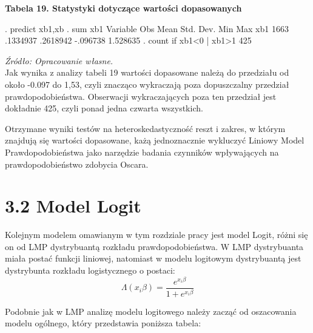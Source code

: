  \vspace{0.5cm}

\textbf{Tabela 19. Statystyki dotyczące wartości dopasowanych}
\begin{stlog}	

. predict xb1,xb
{\smallskip}
. sum xb1
{\smallskip}
    Variable {\VBAR}       Obs        Mean    Std. Dev.       Min        Max
         xb1 {\VBAR}      1663    .1334937    .2618942   -.096738   1.528635
{\smallskip}
. count if xb1<0 | xb1>1
  425

\end{stlog}

\textit{\footnotesize{Źródło: Opracowanie własne.}} \\	

Jak wynika z analizy tabeli 19 wartości dopasowane należą do przedziału od około -0.097 do 1,53, czyli znacząco wykraczają poza dopuszczalny przedział prawdopodobieństwa. Obserwacji wykraczających poza ten przedział jest dokładnie 425, czyli ponad jedna czwarta wszystkich.

Otrzymane wyniki testów na heteroskedastyczność reszt i zakres, w którym znajdują się wartości dopasowane, każą jednoznacznie wykluczyć Liniowy Model Prawdopodobieństwa jako narzędzie badania czynników wpływających na prawdopodobieństwo zdobycia Oscara.

\section*{3.2 Model Logit}

Kolejnym modelem omawianym w tym rozdziale pracy jest model Logit, różni się on od LMP dystrybuantą rozkładu prawdopodobieństwa. W LMP dystrybuanta miała postać funkcji liniowej, natomiast w modelu logitowym dystrybuantą jest dystrybunta rozkładu logistycznego o postaci: 
\begin{equation}
	\Lambda(x_i\beta)=\frac{e^{x_i\beta}}{1+e^{x_i\beta}}
\end{equation}
	
Podobnie jak w LMP analizę modelu logitowego należy zacząć od oszacowania modelu ogólnego, który przedstawia poniższa tabela:

\vspace{0.5cm}

